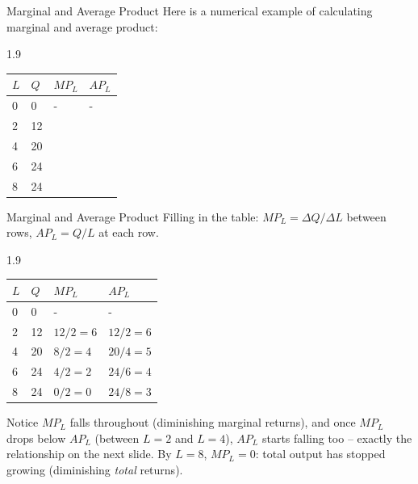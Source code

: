 \documentclass{beamer}
\begin{document}
\begin{frame}{Marginal and Average Product}
  Here is a numerical example of calculating marginal and average product:

  \begin{center}
    \begin{spacing}{1.9}
      \begin{tabular}{ | l | l | l | l |}
        \hline
        $L$ & $Q$ & $MP_L$ & $AP_L$ \\ \hline
        0 & 0  & - & - \\ \hline
        2 & 12 &   &   \\ \hline
        4 & 20 &   &   \\ \hline
        6 & 24 &   &   \\ \hline
        8 & 24 &   &   \\
        \hline
      \end{tabular}
    \end{spacing}
  \end{center}
\end{frame}

\begin{frame}{Marginal and Average Product}
  Filling in the table: $MP_L = \Delta Q / \Delta L$ between rows, $AP_L = Q/L$ at each row.

  \begin{center}
    \begin{spacing}{1.9}
      \begin{tabular}{ | l | l | l | l |}
        \hline
        $L$ & $Q$ & $MP_L$ & $AP_L$ \\ \hline
        0 & 0  & - & - \\ \hline
        2 & 12 & $12/2=6$ & $12/2=6$ \\ \hline
        4 & 20 & $8/2=4$ & $20/4=5$ \\ \hline
        6 & 24 & $4/2=2$ & $24/6=4$ \\ \hline
        8 & 24 & $0/2=0$ & $24/8=3$ \\
        \hline
      \end{tabular}
    \end{spacing}
  \end{center}

  Notice $MP_L$ falls throughout (diminishing marginal returns), and once $MP_L$ drops below $AP_L$ (between $L=2$ and $L=4$), $AP_L$ starts falling too -- exactly the relationship on the next slide. By $L=8$, $MP_L=0$: total output has stopped growing (diminishing \emph{total} returns).
\end{frame}
\end{document}

